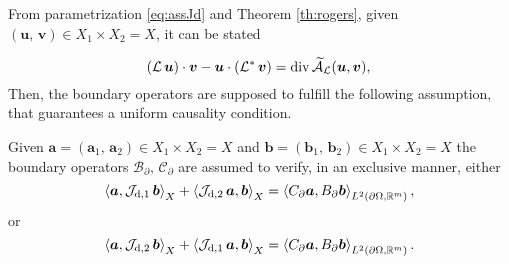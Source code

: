 From parametrization \ref{eq:assJd} and Theorem \ref{th:rogers}, given $(\bm{u}, \, \bm{v}) \in X_1 \times X_2 = X$, it can be stated

\begin{equation}
{(\mathcal{L}\, \bm{u})}\cdot {\bm{v}} - {\bm{u}} \cdot {(\mathcal{L}^* \, \bm{v})} = \div \widetilde{\mathcal{A}}_{\mathcal{L}}(\bm{u}, \bm{v}), \\
\end{equation}
Then, the boundary operators are supposed to fulfill the following assumption, that guarantees a uniform causality condition.

\begin{assumption}\label{ass:operBC}
	Given $\bm{a} = (\bm{a}_1, \, \bm{a}_2) \in X_1 \times X_2 = X$ and $\bm{b}  = (\bm{b}_1, \, \bm{b}_2) \in X_1 \times X_2 = X$ the boundary operators $\mathcal{B}_\partial, \, \mathcal{C}_\partial$ are assumed to verify, in an exclusive manner, either
	\begin{equation}\label{eq:ass1BC}
	\inner[X]{\bm{a}}{\mathcal{J}_{\text{d}, 1}\, \bm{b}} +\inner[X]{\mathcal{J}_{\text{d}, 2}\, \bm{a}}{\bm{b}} = \inner[L^2(\partial \Omega, \mathbb{R}^m)]{C_\partial \bm{a}}{B_\partial  \bm{b}},
	\end{equation}
	or 
	\begin{equation}\label{eq:ass2BC}
	\inner[X]{\bm{a}}{\mathcal{J}_{\text{d}, 2}\, \bm{b}} +\inner[X]{\mathcal{J}_{\text{d}, 1}\, \bm{a}}{\bm{b}} = \inner[L^2(\partial \Omega, \mathbb{R}^m)]{C_\partial \bm{a}}{B_\partial \bm{b}}.
	\end{equation}
	

\end{assumption}
